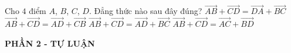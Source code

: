 \begin{ex}%
	Cho $4$ điểm $A$, $B$, $C$, $D$. Đẳng thức nào sau đây đúng?
	\choice
	{$\overrightarrow{AB}+\overrightarrow{CD}=\overrightarrow{DA}+\overrightarrow{BC}$}
	{\True $\overrightarrow{AB}+\overrightarrow{CD}=\overrightarrow{AD}+\overrightarrow{CB}$}
	{$\overrightarrow{AB}+\overrightarrow{CD}=\overrightarrow{AD}+\overrightarrow{BC}$}
	{$\overrightarrow{AB}+\overrightarrow{CD}=\overrightarrow{AC}+\overrightarrow{BD}$}
\end{ex}


\begin{center}
	\textbf{PHẦN 2 - TỰ LUẬN}
\end{center}

